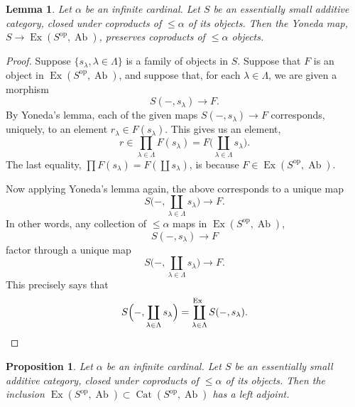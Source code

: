 \documentclass[11pt,a4paper]{article}
\theoremstyle{plain}
\newtheorem{lemma}[theorem]{Lemma}
\newtheorem{proposition}[theorem]{Proposition}
\theoremstyle{definition}
\DeclareMathOperator{\Cat}{Cat}
\DeclareMathOperator{\Ex}{Ex}
\DeclareMathOperator{\Ab}{Ab}
\newcommand{\op}{\mathrm{op}}
\numberwithin{equation}{section}
\begin{document}
\begin{lemma}\label{lem2.4}
Let $\alpha$ be an infinite cardinal. Let $S$ be an essentially small additive category, closed under coproducts of $\leq\alpha$ of its objects. Then the Yoneda map, $S \to \Ex(S^{\op},\Ab)$, preserves coproducts of $\leq\alpha$ objects.
\end{lemma}

\begin{proof}
Suppose $\{s_{\lambda}, \lambda \in \Lambda\}$ is a family of objects in $S$. Suppose that $F$ is an object in $\Ex(S^{\op},\Ab)$, and suppose that, for each $\lambda \in \Lambda$, we are given a morphism
\begin{equation*}
S(-,s_{\lambda}) \longrightarrow F.
\end{equation*}
By Yoneda's lemma, each of the given maps $S(-,s_{\lambda}) \to F$ corresponds, uniquely, to an element $r_{\lambda} \in F(s_{\lambda})$. This gives us an element,
\begin{equation*}
r \in \prod_{\lambda\in\Lambda} F(s_{\lambda}) = F\Big(\coprod_{\lambda\in\Lambda} s_{\lambda}\Big).
\end{equation*}
The last equality, $\prod F(s_{\lambda}) = F(\coprod s_{\lambda})$, is because $F \in \Ex(S^{\op},\Ab)$.

Now applying Yoneda's lemma again, the above corresponds to a unique map
\begin{equation*}
S\Big(-,\coprod_{\lambda\in\Lambda} s_{\lambda}\Big) \longrightarrow F.
\end{equation*}
In other words, any collection of $\leq\alpha$ maps in $\Ex(S^{\op},\Ab)$,
\begin{equation*}
S(-,s_{\lambda}) \longrightarrow F
\end{equation*}
factor through a unique map
\begin{equation*}
S\Big(-,\coprod_{\lambda\in\Lambda} s_{\lambda}\Big) \longrightarrow F.
\end{equation*}
This precisely says that
\begin{equation*}
S\Big(-,\coprod_{\lambda\in\Lambda} s_{\lambda}\Big) = \coprod^{\!\!\!\Ex}_{\lambda\in\Lambda} S(-,s_{\lambda}). \qedhere
\end{equation*}
\end{proof}

\begin{proposition}\label{prop2.5}
Let $\alpha$ be an infinite cardinal. Let $S$ be an essentially small additive category, closed under coproducts of $\leq\alpha$ of its objects. Then the inclusion $\Ex(S^{\op},\Ab) \subset \Cat(S^{\op},\Ab)$ has a left adjoint.
\end{proposition}
\end{document}
